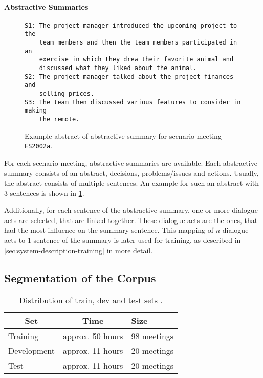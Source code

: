 \paragraph{Abstractive Summaries}

\begin{figure}[h]
\begin{lstlisting}[numbers=none]
S1: The project manager introduced the upcoming project to the 
    team members and then the team members participated in an
    exercise in which they drew their favorite animal and
    discussed what they liked about the animal.
S2: The project manager talked about the project finances and
    selling prices.
S3: The team then discussed various features to consider in making
    the remote.
\end{lstlisting}
\caption{Example abstract of abstractive summary for scenario meeting \texttt{ES2002a}.}
\label{fig:abstractive-summary-example}
\end{figure}

For each scenario meeting, abstractive summaries are available.
Each abstractive summary consists of an abstract, decisions, problems/issues and actions.
Usually, the abstract consists of multiple sentences.
An example for such an abstract with 3 sentences is shown in \cref{fig:abstractive-summary-example}.

Additionally, for each sentence of the abstractive summary, one or more dialogue acts are selected, that are linked together.
These dialogue acts are the ones, that had the most influence on the summary sentence.
This mapping of $n$ dialogue acts to $1$ sentence of the summary is later used for training, as described in \cref{sec:system-description-training} in more detail. \cite{amiWebsite}

\subsection{Segmentation of the Corpus}\label{ssec:ami-segmentation-of-the-corpus}

\begin{table}[h]
\centering
\begin{tabular}{@{}lll@{}}
\toprule
\multicolumn{1}{c}{\textbf{Set}} & \multicolumn{1}{c}{\textbf{Time}} & \textbf{Size} \\ \midrule
Training                         & approx. 50 hours                  & 98 meetings   \\
Development                      & approx. 11 hours                  & 20 meetings   \\
Test                             & approx. 11 hours                  & 20 meetings   \\ \bottomrule
\end{tabular}
\caption[Distribution of train, dev and test sets]{Distribution of train, dev and test sets \cite{amiWebsite}.}
\label{tab:meeting-time-distribution}
\end{table}

